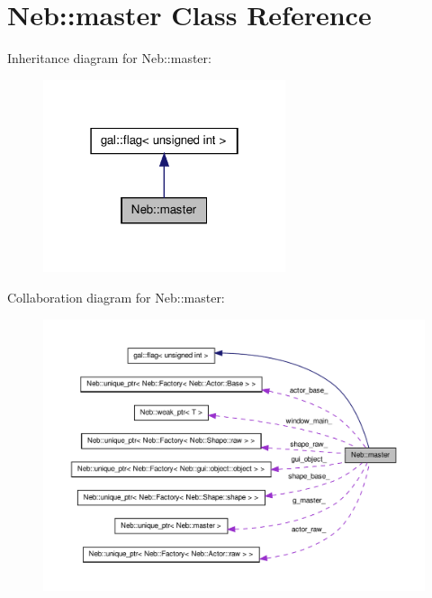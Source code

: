 \hypertarget{classNeb_1_1master}{\section{\-Neb\-:\-:master \-Class \-Reference}
\label{classNeb_1_1master}
}


\-Inheritance diagram for \-Neb\-:\-:master\-:\nopagebreak
\begin{figure}[H]
\begin{center}
\leavevmode
\includegraphics[width=202pt]{classNeb_1_1master__inherit__graph}
\end{center}
\end{figure}


\-Collaboration diagram for \-Neb\-:\-:master\-:\nopagebreak
\begin{figure}[H]
\begin{center}
\leavevmode
\includegraphics[width=350pt]{classNeb_1_1master__coll__graph}
\end{center}
\end{figure}

